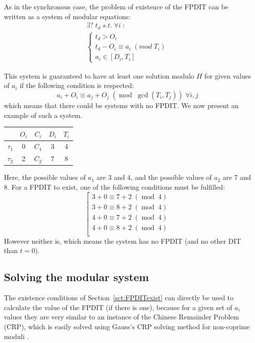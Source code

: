 \documentclass[conference]{IEEEtran}
\begin{document}
		As in the synchronous case, the problem of existence of the FPDIT
		can be written as a system of modular equations:
		\[
			\begin{array}{l}
				\exists ? \; t_d \; s.t. \; \forall i \; :\\
				\left\{
					\begin{array}{l}
						t_d > O_i \\
						t_d - O_i \equiv a_i \; (mod \; T_i) \\
						a_i \in [D_i, T_i]
					\end{array}
				\right.
			\end{array}
		\]

		This system is guaranteed to have at least one solution modulo $H$ for given
		values of $a_i$ if the following condition is respected:
		\[
			a_i + O_i \equiv a_j + O_j \; (\operatorname{mod} \; \operatorname{gcd}(T_i,
			T_j)) \; \forall i,j
		\]
		which means that there could be systems with no FPDIT.
		We now present an example of such a system.\\

		\begin{center}
			\begin{tabular}{|r|c|c|c|c|}
				\hline
							& $O_i$ & $C_i$ & $D_i$ & $T_i$ \\ \hline
				$\tau_1$ 	& 0 	& $C_1$ & 3 	& 4\\ \hline
				$\tau_2$ 	& 2 	& $C_2$ & 7 	& 8\\ \hline
			\end{tabular}
		\end{center}

		Here, the possible values of $a_1$ are 3 and 4, and the possible values
		of $a_2$ are 7 and 8. For a FPDIT to exist, one of the following
		conditions must be fulfilled:
		\[
			\left[
			\begin{array}{c}
				3 + 0 \equiv 7 + 2 \; (\operatorname{mod} \; 4 ) \\
				3 + 0 \equiv 8 + 2 \; (\operatorname{mod} \; 4 ) \\
				4 + 0 \equiv 7 + 2 \; (\operatorname{mod} \; 4 ) \\
				4 + 0 \equiv 8 + 2 \; (\operatorname{mod} \; 4 ) \\
			\end{array}
			\right.
		\]
		However neither is, which means the system has
		no FPDIT (and no other DIT than $t=0$).

	\subsection{Solving the modular system}
		The existence conditions of	Section~\ref{sct:FPDITexist} can directly be used to calculate the value of
		the FPDIT (if there is one), because for a given set of $a_i$ values they are
		very similar to an instance of the Chinese Remainder Problem (CRP), which is
		easily solved using Gauss's CRP solving method for non-coprime moduli
		\cite{gauss1965disquisitiones}.
\end{document}
